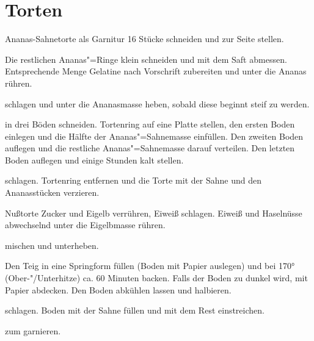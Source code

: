 \section{Torten}

\begin{recipe}{Ananas-Sahnetorte}
  als Garnitur 16 Stücke schneiden und zur Seite stellen.

  Die restlichen Ananas"=Ringe klein schneiden und mit dem Saft abmessen.
  Entsprechende Menge Gelatine nach Vorschrift zubereiten und unter die
  Ananas rühren.

  schlagen und unter die Ananasmasse heben, sobald diese beginnt steif
  zu werden.

  in drei Böden schneiden. Tortenring auf eine Platte stellen, den
  ersten Boden einlegen und die Hälfte der Ananas"=Sahnemasse einfüllen.
  Den zweiten Boden auflegen und die restliche Ananas"=Sahnemasse darauf
  verteilen. Den letzten Boden auflegen und einige Stunden kalt stellen.

  schlagen. Tortenring entfernen und die Torte mit der Sahne und den
  Ananasstücken verzieren.
\end{recipe}



\begin{recipe}{Nußtorte}
  Zucker und Eigelb verrühren, Eiweiß schlagen. Eiweiß und Haselnüsse
  abwechselnd unter die Eigelbmasse rühren.

  mischen und unterheben.

  Den Teig in eine Springform füllen (Boden mit Papier auslegen) und bei
  170° (Ober-"/Unterhitze) ca. 60 Minuten backen. Falls der Boden zu
  dunkel wird, mit Papier abdecken. Den Boden abkühlen lassen und
  halbieren.

  schlagen. Boden mit  der Sahne füllen und mit dem Rest
  einstreichen.

  zum garnieren.  
\end{recipe}



